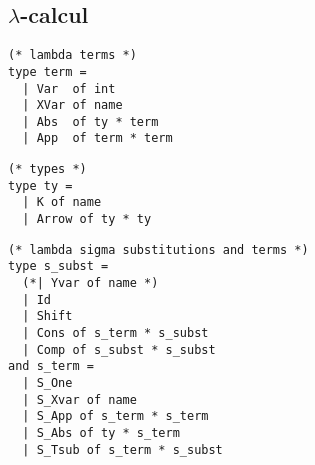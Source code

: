 \subsection{$\lambda$-calcul}

\begin{lstlisting}
(* lambda terms *)
type term =
  | Var  of int
  | XVar of name
  | Abs  of ty * term
  | App  of term * term
\end{lstlisting}

\begin{lstlisting}
(* types *)
type ty =
  | K of name
  | Arrow of ty * ty
\end{lstlisting}

\begin{lstlisting}
(* lambda sigma substitutions and terms *)
type s_subst =
  (*| Yvar of name *)
  | Id
  | Shift
  | Cons of s_term * s_subst
  | Comp of s_subst * s_subst
and s_term =
  | S_One
  | S_Xvar of name
  | S_App of s_term * s_term
  | S_Abs of ty * s_term
  | S_Tsub of s_term * s_subst
\end{lstlisting}

